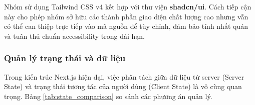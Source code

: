 \vspace{-30pt}

Nhóm sử dụng Tailwind CSS v4 kết hợp với thư viện \textbf{shadcn/ui}. Cách tiếp cận này cho phép nhóm sở hữu các thành phần giao diện chất lượng cao nhưng vẫn có thể can thiệp trực tiếp vào mã nguồn để tùy chỉnh, đảm bảo tính nhất quán và tuân thủ chuẩn accessibility trong dài hạn.

\subsubsection{Quản lý trạng thái và dữ liệu}

Trong kiến trúc Next.js hiện đại, việc phân tách giữa dữ liệu từ server (Server State) và trạng thái tương tác của người dùng (Client State) là vô cùng quan trọng. Bảng \ref{tab:state_comparison} so sánh các phương án quản lý.

